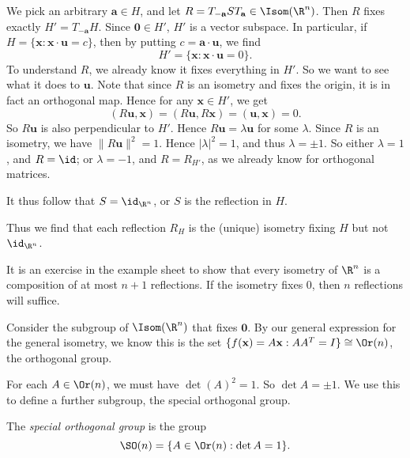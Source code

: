 \documentclass[a4paper]{article}
\begin{document}
\begin{eg}
  We pick an arbitrary $\mathbf{a} \in H$, and let $R = T_{-\mathbf{a}} S T_\mathbf{a} \in \Isom(\R^n)$. Then $R$ fixes exactly $H' = T_{-\mathbf{a}} H$. Since $\mathbf{0} \in H'$, $H'$ is a vector subspace. In particular, if $H = \{\mathbf{x}: \mathbf{x}\cdot \mathbf{u} = c\}$, then by putting $c = \mathbf{a}\cdot \mathbf{u}$, we find
  \[
    H' = \{\mathbf{x}: \mathbf{x}\cdot \mathbf{u} = 0\}.
  \]
  To understand $R$, we already know it fixes everything in $H'$. So we want to see what it does to $\mathbf{u}$. Note that since $R$ is an isometry and fixes the origin, it is in fact an orthogonal map. Hence for any $\mathbf{x} \in H'$, we get
  \[
    (R\mathbf{u}, \mathbf{x}) = (R\mathbf{u}, R\mathbf{x}) = (\mathbf{u}, \mathbf{x}) = 0.
  \]
  So $R\mathbf{u}$ is also perpendicular to $H'$. Hence $R\mathbf{u} = \lambda \mathbf{u}$ for some $\lambda$. Since $R$ is an isometry, we have $\|R\mathbf{u}\|^2 = 1$. Hence $|\lambda|^2 = 1$, and thus $\lambda = \pm 1$. So either $\lambda = 1$, and $R = \id$; or $\lambda = -1$, and $R = R_{H'}$, as we already know for orthogonal matrices.

  It thus follow that $S = \id_{\R^n}$, or $S$ is the reflection in $H$.

  Thus we find that each reflection $R_H$ is the (unique) isometry fixing $H$ but not $\id_{\R^n}$.
\end{eg}
It is an exercise in the example sheet to show that every isometry of $\R^n$ is a composition of at most $n + 1$ reflections. If the isometry fixes $0$, then $n$ reflections will suffice.

Consider the subgroup of $\Isom(\R^n)$ that fixes $\mathbf{0}$. By our general expression for the general isometry, we know this is the set $\{f(\mathbf{x}) = A\mathbf{x}: A A^T = I\} \cong \Or(n)$, the orthogonal group.

For each $A \in \Or(n)$, we must have $\det(A)^2 = 1$. So $\det A = \pm 1$. We use this to define a further subgroup, the special orthogonal group.
\begin{defi}
  The \emph{special orthogonal group} is the group
  \[
    \SO(n) = \{A \in \Or(n):\det A = 1\}.
  \]
\end{defi}
\end{document}
